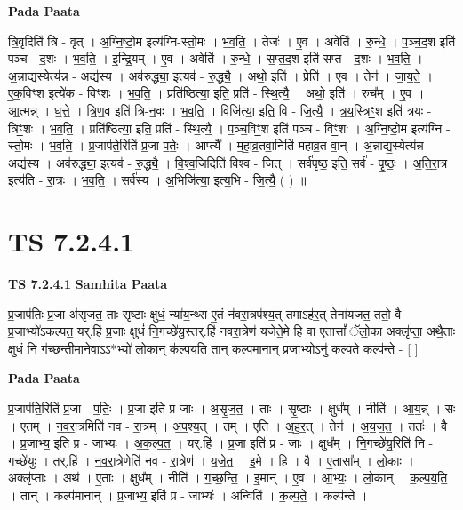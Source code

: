 \documentclass[17pt]{extarticle}
\begin{document}
\textbf{Pada Paata} \newline

त्रि॒वृदिति॑ त्रि - वृत् । अ॒ग्नि॒ष्टो॒म इत्य॑ग्नि-स्तो॒मः । भ॒व॒ति॒ । तेजः॑ । ए॒व । अवेति॑ । रु॒न्धे॒ । प॒ञ्च॒द॒श इति॑ पञ्च - द॒शः । भ॒व॒ति॒ । इ॒न्द्रि॒यम् । ए॒व । अवेति॑ । रु॒न्धे॒ । स॒प्त॒द॒श इति॑ सप्त - द॒शः । भ॒व॒ति॒ । अ॒न्नाद्य॒स्येत्य॑न्न - अद्य॑स्य । अव॑रुद्ध्या॒ इत्यव॑ - रु॒द्ध्यै॒ । अथो॒ इति॑ । प्रेति॑ । ए॒व । तेन॑ । जा॒य॒ते॒ । ए॒क॒विꣳ॒॒श इत्ये॑क - विꣳ॒॒शः । भ॒व॒ति॒ । प्रति॑ष्ठित्या॒ इति॒ प्रति॑ - स्थि॒त्यै॒ । अथो॒ इति॑ । रुच᳚म् । ए॒व । आ॒त्मन्न् । ध॒त्ते॒ । त्रि॒ण॒व इति॑ त्रि-न॒वः । भ॒व॒ति॒ । विजि॑त्या॒ इति॒ वि - जि॒त्यै॒ । त्र॒य॒स्त्रिꣳ॒॒श इति॑ त्रयः - त्रिꣳ॒॒शः । भ॒व॒ति॒ । प्रति॑ष्ठित्या॒ इति॒ प्रति॑ - स्थि॒त्यै॒ । प॒ञ्च॒विꣳ॒॒श इति॑ पञ्च - विꣳ॒॒शः । अ॒ग्नि॒ष्टो॒म इत्य॑ग्नि - स्तो॒मः । भ॒व॒ति॒ । प्र॒जाप॑ते॒रिति॑ प्र॒जा-प॒तेः॒ । आप्त्यै᳚ । म॒हा॒व्र॒तवा॒निति॑ महाव्र॒त-वा॒न् । अ॒न्नाद्य॒स्येत्य॑न्न - अद्य॑स्य । अव॑रुद्ध्या॒ इत्यव॑ - रु॒द्ध्यै॒ । वि॒श्व॒जिदिति॑ विश्व - जित् । सर्व॑पृष्ठ॒ इति॒ सर्व॑ - पृ॒ष्ठः॒ । अ॒ति॒रा॒त्र इत्य॑ति - रा॒त्रः । भ॒व॒ति॒ । सर्व॑स्य । अ॒भिजि॑त्या॒ इत्य॒भि - जि॒त्यै॒ ( ) ॥  \newline




\section*{ TS 7.2.4.1 }

\textbf{TS 7.2.4.1 } \newline
\textbf{Samhita Paata} \newline

प्र॒जाप॑तिः प्र॒जा अ॑सृजत॒ ताः सृ॒ष्टाः क्षुधं॒ न्या॑य॒न्थ्स ए॒तं न॑वरा॒त्रप॑श्य॒त् तमाऽह॑र॒त् तेना॑यजत॒ ततो॒ वै प्र॒जाभ्यो॑ऽकल्पत॒ यर्.हि॑ प्र॒जाः क्षुधं॑ नि॒गच्छे॑यु॒स्तर्.हि॑ नवरा॒त्रेण॑ यजेते॒मे हि वा ए॒तासां᳚ ॅलो॒का अक्लृ॑प्ता॒ अथै॒ताः क्षुधं॒ नि ग॑च्छन्ती॒माने॒वाऽऽ*भ्यो॑ लो॒कान् क॑ल्पयति॒ तान् कल्प॑मानान् प्र॒जाभ्योऽनु॑ कल्पते॒ कल्प॑न्ते - [  ] \newline

\textbf{Pada Paata} \newline

प्र॒जाप॑ति॒रिति॑ प्र॒जा - प॒तिः॒ । प्र॒जा इति॑ प्र-जाः । अ॒सृ॒ज॒त॒ । ताः । सृ॒ष्टाः । क्षुध᳚म् । नीति॑ । आ॒य॒न्न् । सः । ए॒तम् । न॒व॒रा॒त्रमिति॑ नव - रा॒त्रम् । अ॒प॒श्य॒त् । तम् । एति॑ । अ॒ह॒र॒त् । तेन॑ । अ॒य॒ज॒त॒ । ततः॑ । वै । प्र॒जाभ्य॒ इति॑ प्र - जाभ्यः॑ । अ॒क॒ल्प॒त॒ । यर्.हि॑ । प्र॒जा इति॑ प्र - जाः । क्षुध᳚म् । नि॒गच्छे॑यु॒रिति॑ नि - गच्छे॑युः । तर्.हि॑ । न॒व॒रा॒त्रेणेति॑ नव - रा॒त्रेण॑ । य॒जे॒त॒ । इ॒मे । हि । वै । ए॒तासा᳚म् । लो॒काः । अक्लृ॑प्ताः । अथ॑ । ए॒ताः । क्षुध᳚म् । नीति॑ । ग॒च्छ॒न्ति॒ । इ॒मान् । ए॒व । आ॒भ्यः॒ । लो॒कान् । क॒ल्प॒य॒ति॒ । तान् । कल्प॑मानान् । प्र॒जाभ्य॒ इति॑ प्र - जाभ्यः॑ । अन्विति॑ । क॒ल्प॒ते॒ । कल्प॑न्ते ।  \newline
\end{document}
